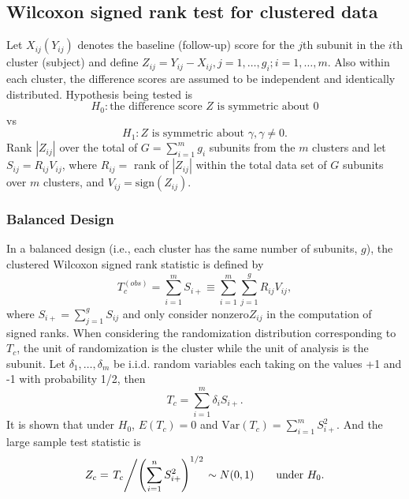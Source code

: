 \documentclass[12pt]{article}
\begin{document}
\subsection{Wilcoxon signed rank test for clustered data}
Let $X_{ij} (Y_{ij})$ denotes the baseline (follow-up) score for the $j$th subunit in the $i$th cluster (subject) and define $Z_{ij} = Y_{ij} - X_{ij}, j = 1, \ldots,g_i; i = 1,\ldots,m$. Also within each cluster, the difference scores are assumed to be independent and identically distributed. Hypothesis being tested is
\begin{equation*}
H_0: \text{the difference score } Z \text{ is symmetric about 0}
\end{equation*}
vs
\begin{equation*}
H_1: Z \text{ is symmetric about }\gamma, \gamma \not = 0.
\end{equation*}
Rank $|Z_{ij}|$ over the total of $G = \sum_{i=1}^m g_i$ subunits from the $m$ clusters and let $S_{ij}=R_{ij}V_{ij}$, where $R_{ij} = $ rank of $|Z_{ij}|$ within the total data set of $G$ subunits over $m$ clusters, and $V_{ij} = \text{sign}(Z_{ij})$.
\subsubsection{Balanced Design} \label{bal1}
In a balanced design (i.e., each cluster has the same number of subunits, $g$), the clustered Wilcoxon signed rank statistic is defined by 
\begin{equation}
T_{c}^{(obs)} = \sum_{i=1}^mS_{i+} \equiv \sum^m_{i=1}\sum^g_{j=1}R_{ij}V_{ij},
\end{equation}
where $S_{i+} = \sum_{j=1}^gS_{ij}$ and only consider nonzero$Z_{ij}$ in the computation of signed ranks.
When considering the randomization distribution corresponding to $T_c$, the unit of randomization is the cluster while the unit of analysis is the subunit. Let $\delta_1, \ldots,\delta_m$ be i.i.d. random variables each taking on the values +1 and -1 with probability 1/2, then 
\begin{equation} \label{eq:tc}
T_c = \sum_{i=1}^m\delta_iS_{i+}.
\end{equation}
It is shown that under $H_0$, $E(T_c) = 0$ and $\text{Var}(T_c) = \sum^m_{i=1}S^2_{i+}$.
And the large sample test statistic is 
\begin{equation}
Z_c = \left. T_c \middle/ \left(\sum_{i=1}^nS^2_{i+}\right)^{1/2}\right. \sim N(0, 1)\qquad \text{under } H_0.
\end{equation}
\end{document}
